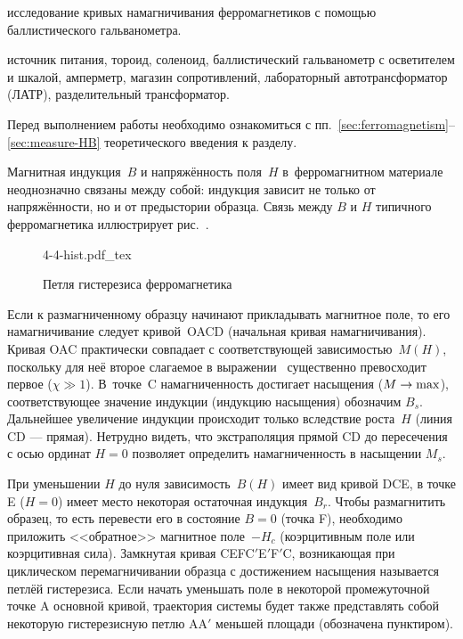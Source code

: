 
\begin{lab:aim}
	исследование кривых намагничивания ферромагнетиков с помощью баллистического
гальванометра.
\end{lab:aim}

\begin{lab:equipment}
	источник питания, тороид, соленоид, баллистический гальванометр с
осветителем и шкалой,
	амперметр, магазин сопротивлений, лабораторный автотрансформатор (ЛАТР),
разделительный трансформатор.
\end{lab:equipment}


Перед выполнением работы необходимо ознакомиться с
пп.~\ref{sec:ferromagnetism}--\ref{sec:measure-HB} теоретического введения к
разделу.

Магнитная индукция~${B}$ и напряжённость поля~${H}$
в~ферромагнитном материале неоднозначно связаны между
собой: индукция зависит не только от напряжённости, но и от предыстории образца.
Связь между $B$ и $H$ типичного ферромагнетика иллюстрирует
рис.~.

\begin{figure}[h]
    \centering
    {4-4-hist.pdf_tex}
    \caption{Петля гистерезиса ферромагнетика}
\end{figure}

Если к размагниченному образцу начинают прикладывать магнитное поле,
то его намагничивание следует кривой~OACD (начальная кривая намагничивания).
Кривая OAC практически совпадает с соответствующей зависимостью~$M(H)$,
поскольку для неё второе слагаемое в выражении~
существенно превосходит первое ($\chi\gg1$). В~точке~C намагниченность
достигает насыщения ($M\to \rm max$), соответствующее значение
индукции (индукцию насыщения) обозначим $B_s$.
Дальнейшее увеличение индукции происходит только вследствие
роста~$H$ (линия CD --- прямая). Нетрудно видеть, что экстраполяция прямой CD до пересечения
с осью ординат $H=0$ позволяет определить намагниченность в насыщении
$M_s$.

При уменьшении $H$ до нуля зависимость~$B(H)$ имеет вид
кривой DCE, в точке E ($H=0$) имеет место некоторая остаточная индукция~$B_r$.
Чтобы размагнитить образец, то есть перевести
его в состояние $B=0$ (точка F), необходимо приложить <<обратное>> магнитное поле~$-H_c$
(коэрцитивным поле или коэрцитивная сила).
Замкнутая кривая CEFC$'$E$'$F$'$C, возникающая при циклическом перемагничивании
образца с достижением насыщения
называется  петлёй гистерезиса. Если начать уменьшать поле
в некоторой промежуточной точке A основной кривой, траектория
системы будет также представлять собой некоторую гистерезисную петлю AA$'$
меньшей площади (обозначена пунктиром).

